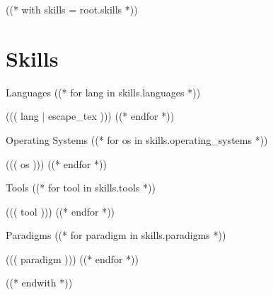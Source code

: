 ((* with skills = root.skills *))
\section{Skills}\relax
    \vspace{-2em} %
    \begin{multicols}{2}
        \begin{csitemize}{Languages}
        ((* for lang in skills.languages *))
            \item ((( lang | escape_tex )))
        ((* endfor *))
        \end{csitemize}

        \begin{csitemize}{Operating Systems}
        ((* for os in skills.operating_systems *))
            \item ((( os )))
        ((* endfor *))
        \end{csitemize}

        \begin{csitemize}{Tools}
        ((* for tool in skills.tools *))
            \item ((( tool )))
        ((* endfor *))
        \end{csitemize}

        \begin{csitemize}{Paradigms}
        ((* for paradigm in skills.paradigms *))
            \item ((( paradigm )))
        ((* endfor *))
        \end{csitemize}
    \end{multicols}
((* endwith *))
